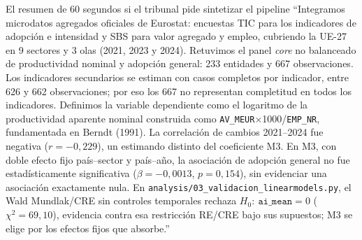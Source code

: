 \documentclass[11pt,a4paper]{article}
\begin{document}
\vspace{0.3cm}

\begin{speechbox}{El resumen de 60 segundos si el tribunal pide sintetizar el pipeline}
``Integramos microdatos agregados oficiales de Eurostat: encuestas TIC para los indicadores de adopción e intensidad y SBS para valor agregado y empleo, cubriendo la UE-27 en 9 sectores y 3 olas (2021, 2023 y 2024). Retuvimos el panel \textit{core} no balanceado de productividad nominal y adopción general: 233 entidades y 667 observaciones. Los indicadores secundarios se estiman con casos completos por indicador, entre 626 y 662 observaciones; por eso los 667 no representan completitud en todos los indicadores. Definimos la variable dependiente como el logaritmo de la productividad aparente nominal construida como \texttt{AV\_MEUR}$\times$1000/\texttt{EMP\_NR}, fundamentada en Berndt (1991). La correlación de cambios 2021--2024 fue negativa ($r=-0{,}229$), un estimando distinto del coeficiente M3. En M3, con doble efecto fijo país--sector y país--año, la asociación de adopción general no fue estadísticamente significativa ($\beta=-0{,}0013$, $p=0{,}154$), sin evidenciar una asociación exactamente nula. En \texttt{analysis/03\_validacion\_linearmodels.py}, el Wald Mundlak/CRE sin controles temporales rechaza $H_0:\ \texttt{ai\_mean}=0$ ($\chi^2=69{,}10$), evidencia contra esa restricción RE/CRE bajo sus supuestos; M3 se elige por los efectos fijos que absorbe.''
\end{speechbox}
\end{document}

